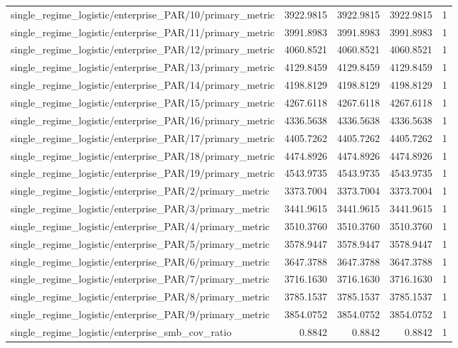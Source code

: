 \begin{table}[h]
\begin{tabular}{lrrrr}
single_regime_logistic/enterprise_PAR/10/primary_metric & 3922.9815 & 3922.9815 & 3922.9815 & 1 \\
single_regime_logistic/enterprise_PAR/11/primary_metric & 3991.8983 & 3991.8983 & 3991.8983 & 1 \\
single_regime_logistic/enterprise_PAR/12/primary_metric & 4060.8521 & 4060.8521 & 4060.8521 & 1 \\
single_regime_logistic/enterprise_PAR/13/primary_metric & 4129.8459 & 4129.8459 & 4129.8459 & 1 \\
single_regime_logistic/enterprise_PAR/14/primary_metric & 4198.8129 & 4198.8129 & 4198.8129 & 1 \\
single_regime_logistic/enterprise_PAR/15/primary_metric & 4267.6118 & 4267.6118 & 4267.6118 & 1 \\
single_regime_logistic/enterprise_PAR/16/primary_metric & 4336.5638 & 4336.5638 & 4336.5638 & 1 \\
single_regime_logistic/enterprise_PAR/17/primary_metric & 4405.7262 & 4405.7262 & 4405.7262 & 1 \\
single_regime_logistic/enterprise_PAR/18/primary_metric & 4474.8926 & 4474.8926 & 4474.8926 & 1 \\
single_regime_logistic/enterprise_PAR/19/primary_metric & 4543.9735 & 4543.9735 & 4543.9735 & 1 \\
single_regime_logistic/enterprise_PAR/2/primary_metric & 3373.7004 & 3373.7004 & 3373.7004 & 1 \\
single_regime_logistic/enterprise_PAR/3/primary_metric & 3441.9615 & 3441.9615 & 3441.9615 & 1 \\
single_regime_logistic/enterprise_PAR/4/primary_metric & 3510.3760 & 3510.3760 & 3510.3760 & 1 \\
single_regime_logistic/enterprise_PAR/5/primary_metric & 3578.9447 & 3578.9447 & 3578.9447 & 1 \\
single_regime_logistic/enterprise_PAR/6/primary_metric & 3647.3788 & 3647.3788 & 3647.3788 & 1 \\
single_regime_logistic/enterprise_PAR/7/primary_metric & 3716.1630 & 3716.1630 & 3716.1630 & 1 \\
single_regime_logistic/enterprise_PAR/8/primary_metric & 3785.1537 & 3785.1537 & 3785.1537 & 1 \\
single_regime_logistic/enterprise_PAR/9/primary_metric & 3854.0752 & 3854.0752 & 3854.0752 & 1 \\
single_regime_logistic/enterprise_smb_cov_ratio & 0.8842 & 0.8842 & 0.8842 & 1 \\

\end{tabular}
\end{table}
